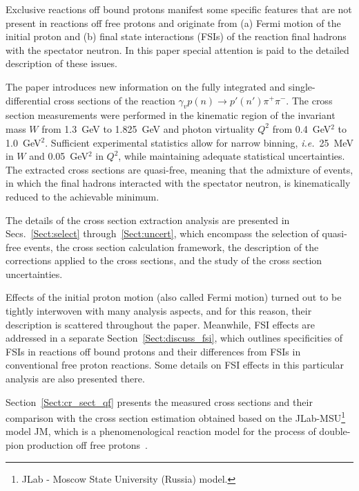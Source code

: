 \documentclass[prc,twocolumn,superscriptaddress,showpacs,amssymb,amsmath,amsfonts,aps,nofootinbib]{revtex4-1}
\begin{document}
Exclusive reactions off bound protons manifest some specific features that are not present in reactions off free protons and originate from (a) Fermi motion of the initial proton and (b) final state interactions (FSIs) of the reaction final hadrons with the spectator neutron. In this paper special attention is paid to the detailed description of these issues.




The paper introduces new information on the fully integrated and single-differential cross sections of the reaction $\gamma_{v}p(n) \rightarrow p' (n')\pi^{+}\pi^{-}$. The cross section measurements were performed in the kinematic region of the invariant mass $W$ from 1.3~GeV to 1.825~GeV and photon virtuality $Q^{2}$ from 0.4~GeV$^2$ to 1.0~GeV$^2$. Sufficient experimental statistics allow for narrow binning, {\it i.e.}~25~MeV in $W$ and 0.05~GeV$^2$ in $Q^2$, while maintaining adequate statistical uncertainties. The extracted cross sections are quasi-free, meaning that the admixture of events, in which the final hadrons interacted with the spectator neutron, is kinematically reduced to the achievable minimum.



The details of the cross section extraction analysis are presented in Secs.~\ref{Sect:select} through~\ref{Sect:uncert}, which encompass the selection of quasi-free events, the cross section calculation framework, the description of the corrections applied to the cross sections, and the study of the cross section uncertainties. 



Effects of the initial proton motion (also called Fermi motion) turned out to be tightly interwoven with many analysis aspects, and for this reason, their description is scattered throughout the paper. Meanwhile, FSI effects are addressed in a separate Section~\ref{Sect:discuss_fsi}, which outlines specificities of FSIs in reactions off bound protons and their differences from FSIs in conventional free proton reactions. Some details on FSI effects in this particular analysis are also presented there.




Section~\ref{Sect:cr_sect_qf} presents the measured cross sections and their comparison with the cross section estimation obtained based on the JLab-MSU\footnote[1]{JLab - Moscow State University (Russia) model.} model JM, which is a phenomenological reaction model for the process of double-pion production off free protons~\cite{Mokeev:2008iw,Mokeev:2012vsa,Mokeev:2015lda}.
\end{document}
